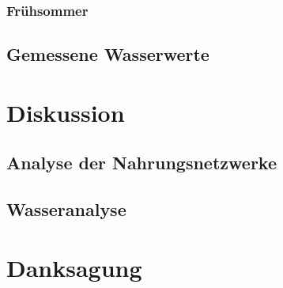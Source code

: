 \documentclass{article}
\begin{document}
        \subsubsection{Frühsommer}
        
    \subsection{Gemessene Wasserwerte}


\section{Diskussion}

    \subsection{Analyse der Nahrungsnetzwerke}
    
        
    
    \subsection{Wasseranalyse}
    

\section{Danksagung}
\end{document}
